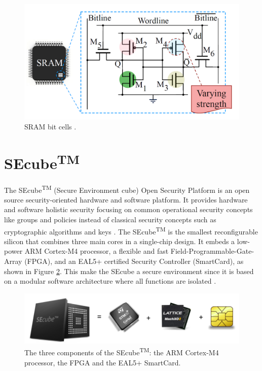 \begin{figure}[h!]
\vspace{0.5cm}
\includegraphics[width=\textwidth]{images/SRAM_cell.png}
\caption{SRAM bit cells \cite{PUF_Sutar}. }
\label{fig:SRAM_cell} %
\end{figure}


\section{SEcube\textsuperscript{TM}}
The SEcube\textsuperscript{TM} (Secure Environment cube) Open Security Platform is an open source security-oriented hardware and software platform. It provides hardware and software holistic security focusing on common operational security concepts like groups and policies instead of classical security concepts such as cryptographic algorithms and keys \cite{SEcubeDoc}. The SEcube\textsuperscript{TM} is the smallest reconfigurable silicon that combines three main cores in a single-chip design. It embeds a low-power ARM Cortex-M4 processor, a flexible and fast Field-Programmable-Gate-Array (FPGA), and an EAL5+ certified Security Controller (SmartCard), as shown in Figure \ref{fig:SEcubeComponents}. This make the SEcube a secure environment since it is based on a modular software architecture where all functions are isolated \cite{SEcubeSite}.

\begin{figure}[h!]
\vspace{0.5cm}
\includegraphics[width=\textwidth]{images/SEcubeComponents.png}
\caption{The three components of the SEcube\textsuperscript{TM}: the ARM Cortex-M4 processor, the FPGA and the EAL5+ SmartCard\cite{SEcubeDoc}. }
\label{fig:SEcubeComponents} %
\end{figure}





